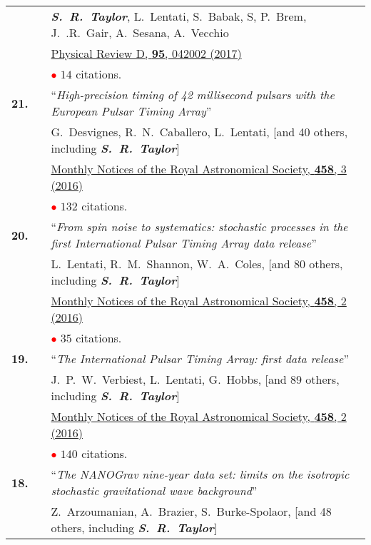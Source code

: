 \documentclass[11pt,letterpaper,sans]{moderncv}
\begin{document}
{\begin{longtable}{rp{0.3cm}p{15.8cm}}
&& \textit{\textbf{S.~R.~Taylor}},  L.~Lentati, S.~Babak, S, P.~Brem, J.~.R.~Gair, A.~Sesana, A.~Vecchio \\ 
&&  \href{https://journals.aps.org/prd/abstract/10.1103/PhysRevD.95.042002}{{\color{color1} Physical Review D, \textbf{95}, 042002 (2017)}} \\
&& \textcolor{red}{$\bullet$} $14$ citations. \vspace{0.09cm}\\
\textbf{21.} & & ``\textit{High-precision timing of 42 millisecond pulsars with the European Pulsar Timing Array}'' \\ 
&& G.~Desvignes, R.~N.~Caballero, L.~Lentati, [and 40 others, including \textit{\textbf{S.~R.~Taylor}}] \\ 
&&  \href{http://mnras.oxfordjournals.org/content/458/3/3341}{{\color{color1} Monthly Notices of the Royal Astronomical Society, \textbf{458}, 3 (2016)}} \\
&& \textcolor{red}{$\bullet$} $132$ citations. \vspace{0.09cm}\\
\textbf{20.} & & ``\textit{From spin noise to systematics: stochastic processes in the first International Pulsar Timing Array data release}'' \\ 
&& L.~Lentati, R.~M.~Shannon, W.~A.~Coles, [and 80 others, including \textit{\textbf{S.~R.~Taylor}}] \\ 
&&  \href{http://mnras.oxfordjournals.org/content/458/2/2161}{{\color{color1} Monthly Notices of the Royal Astronomical Society, \textbf{458}, 2 (2016)}} \\
&& \textcolor{red}{$\bullet$} $35$ citations. \vspace{0.09cm}\\
\textbf{19.} & & ``\textit{The International Pulsar Timing Array: first data release}'' \\ 
&& J.~P.~W.~Verbiest, L.~Lentati, G.~Hobbs, [and 89 others, including \textit{\textbf{S.~R.~Taylor}}] \\ 
&&  \href{http://mnras.oxfordjournals.org/content/458/2/1267}{{\color{color1} Monthly Notices of the Royal Astronomical Society, \textbf{458}, 2 (2016)}} \\
&& \textcolor{red}{$\bullet$} $140$ citations. \vspace{0.09cm}\\
\textbf{18.} & & ``\textit{The NANOGrav nine-year data set: limits on the isotropic stochastic gravitational wave background}'' \\ 
&& Z.~Arzoumanian, A.~Brazier, S.~Burke-Spolaor, [and 48 others, including \textit{\textbf{S.~R.~Taylor}}] \\ 

\end{longtable}}
\end{document}
